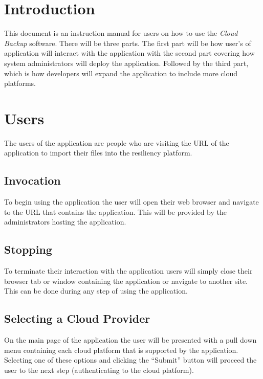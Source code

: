 \documentclass{article}
\begin{document}
    


    \tableofcontents
    \newpage
    \listoffigures


    \newpage
    \begin{versionhistory}
    \end{versionhistory}
    \newpage


    \section{Introduction}
        This document is an instruction manual for users on how to use the \textit{Cloud Backup} software. There will be three parts.
        The first part will be how user's of application will interact with the application with the second part covering how system
        administrators will deploy the application. Followed by the third part, which is how developers will expand the application to
        include more cloud platforms.

    \section{Users}
      The users of the application are people who are visiting the URL of the application to import their files into the resiliency platform.

      \subsection{Invocation}
      To begin using the application the user will open their web browser and navigate to the URL that contains the application. This will be provided
      by the administrators hosting the application.

      \subsection{Stopping}
      To terminate their interaction with the application users will simply close their browser tab or window containing the application or navigate to another
      site. This can be done during any step of using the application. 

      \subsection{Selecting a Cloud Provider}
      On the main page of the application the user will be presented with a pull down menu containing each cloud platform that is supported by the application. Selecting
      one of these options and clicking the ``Submit'' button will proceed the user to the next step (authenticating to the cloud platform).
\end{document}
